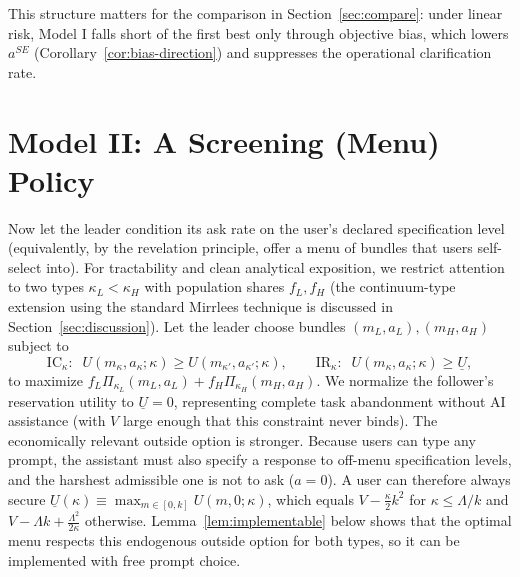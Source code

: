 \documentclass[11pt]{article}
\begin{document}
This structure matters for the comparison in Section~\ref{sec:compare}:
under linear risk, Model I falls short of the first best only through objective bias, which lowers $a^{SE}$ (Corollary~\ref{cor:bias-direction}) and suppresses the operational clarification rate.

\section{Model II: A Screening (Menu) Policy}
\label{sec:model2}

Now let the leader condition its ask rate on the user's declared specification
level (equivalently, by the revelation principle, offer a menu of bundles that
users self-select into). For tractability and clean analytical exposition, we restrict attention to two types $\kappa_L<\kappa_H$ with population
shares $f_L,f_H$ (the continuum-type extension using the standard Mirrlees technique is discussed in Section~\ref{sec:discussion}). Let the leader choose bundles $(m_L,a_L),(m_H,a_H)$ subject
to
\[
\text{IC}_\kappa:\;\; U(m_\kappa,a_\kappa;\kappa) \ge U(m_{\kappa'},a_{\kappa'};\kappa), \qquad
\text{IR}_\kappa:\;\; U(m_\kappa,a_\kappa;\kappa) \ge \underline{U},
\]
to maximize $f_L\Pi_{\kappa_L}(m_L,a_L)+f_H\Pi_{\kappa_H}(m_H,a_H)$.
We normalize the follower's reservation utility to $\underline{U} = 0$, representing complete task abandonment without AI assistance (with $V$ large enough that this constraint never binds). The economically relevant outside option is stronger. Because users can type any prompt, the assistant must also specify a response to off-menu specification levels, and the harshest admissible one is not to ask ($a = 0$). A user can therefore always secure $\underline{U}(\kappa) \equiv \max_{m\in[0,k]} U(m, 0; \kappa)$, which equals $V - \frac{\kappa}{2}k^2$ for $\kappa \le \Lambda/k$ and $V - \Lambda k + \frac{\Lambda^2}{2\kappa}$ otherwise. Lemma~\ref{lem:implementable} below shows that the optimal menu respects this endogenous outside option for both types, so it can be implemented with free prompt choice.
\end{document}
